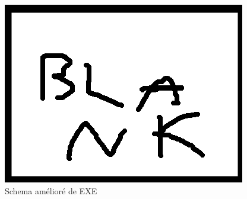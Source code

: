 \documentclass{article}
\begin{document}
\begin{figure}[H]
\includegraphics[scale=1]{pics/blank.png}
\centering
\caption{Schema amélioré de EXE}
\label{exe2}
\end{figure}


\end{document}
